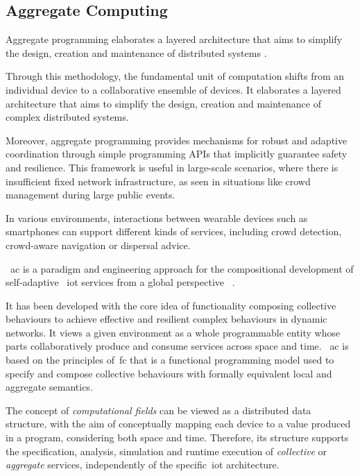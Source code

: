 \subsection{Aggregate Computing}
\label{subsec:aggregate-computing}

Aggregate programming elaborates a layered architecture that aims to simplify the design, creation and maintenance of
distributed systems \cite{CASADEI2019252}.

Through this methodology, the fundamental unit of computation shifts from an individual device to a collaborative
ensemble of devices.
It elaborates a layered architecture that aims to simplify the design, creation and maintenance of complex distributed
systems.

Moreover, aggregate programming provides mechanisms for robust and adaptive coordination through simple programming APIs
that implicitly guarantee safety and resilience.
This framework is useful in large-scale scenarios, where there is insufficient fixed network infrastructure, as seen in
situations like crowd management during large public events.

In various environments, interactions between wearable devices such as smartphones can support different kinds of services,
including crowd detection, crowd-aware navigation or dispersal advice.

~\ac{ac} is a paradigm and engineering approach for the compositional development of self-adaptive ~\ac{iot} services
from a global perspective ~\cite{10.1145/3579353}.

It has been developed with the core idea of functionality composing collective behaviours to achieve effective and resilient
complex behaviours in dynamic networks.
It views a given environment as a whole programmable entity whose parts collaboratively produce and consume services
across space and time.
~\ac{ac} is based on the principles of~\ac{fc} that is a functional programming model used to specify
and compose collective behaviours with formally equivalent local and aggregate semantics.

The concept of \emph{computational fields} can be viewed as a distributed data structure,
with the aim of conceptually mapping each device to a value produced in a program, considering both
space and time.
Therefore, its structure supports the specification, analysis, simulation and runtime execution of \emph{collective}
or \emph{aggregate} services, independently of the specific~\ac{iot} architecture.

